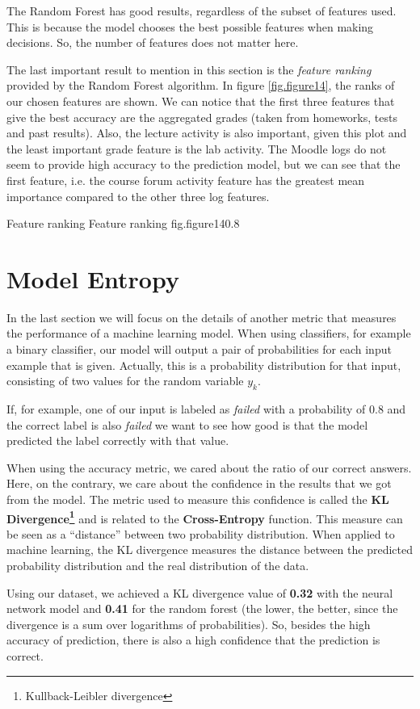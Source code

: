 The Random Forest has good results, regardless of the subset of features used. 
This is because the model chooses the best possible features when making 
decisions. So, the number of features does not matter here.

The last important result to mention in this section is the {\it feature 
ranking} provided by the Random Forest algorithm. In figure \ref{fig.figure14}, 
the ranks of our chosen features are shown. We can notice that the first three 
features that give the best accuracy are the aggregated grades (taken from 
homeworks, tests and past results). Also, the lecture activity is also important, 
given this plot and the least important grade feature is the lab activity. 
The Moodle logs do not seem to provide high accuracy to the prediction model, 
but we can see that the first feature, i.e. the course forum activity feature has 
the greatest mean importance compared to the other three log features.

%
    {Feature ranking}%
    {Feature ranking}%
    {fig.figure14}{0.8}

\section{Model Entropy}

In the last section we will focus on the details of another metric that measures 
the performance of a machine learning model. When using classifiers, for example 
a binary classifier, our model will output a pair of probabilities for each 
input example that is given. Actually, this is a probability distribution for 
that input, consisting of two values for the random variable $y_{k}$. 

If, for example, one of our input is labeled as {\it failed} with a probability 
of 0.8 and the correct label is also {\it failed} we want to see how good is that 
the model predicted the label correctly with that value. 

When using the accuracy metric, we cared about the ratio of our correct answers. 
Here, on the contrary, we care about the confidence in the results that we got 
from the model. The metric used to measure this confidence is called the 
{\bf KL Divergence\footnote{Kullback-Leibler divergence}} and is related to the 
{\bf Cross-Entropy} function. This measure can be seen as a ``distance'' between 
two probability distribution. When applied to machine learning, the KL divergence 
measures the distance between the predicted probability distribution and the 
real distribution of the data. 

Using our dataset, we achieved a KL divergence value of {\bf 0.32} with the neural 
network model and {\bf 0.41} for the random forest (the lower, the better, since 
the divergence is a sum over logarithms of probabilities). So, besides the high 
accuracy of prediction, there is also a high confidence that the prediction is 
correct. 
 